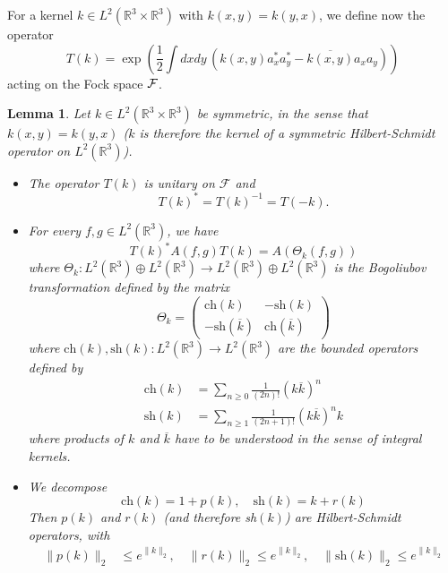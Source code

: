 \documentclass[11pt,a4paper,DIV11]{scrartcl}	%
\newtheorem{lem}[thm]{Lemma}
\newcommand{\bR}{{\mathbb R}}
\newcommand{\cF}{{\cal F}}
\newcommand{\R}{\mathds{R}}
\begin{document}
\medskip

For a kernel $k \in L^2 (\bR^3 \times \bR^3)$ with $k (x,y) = k(y,x)$, we define now the operator 
\begin{equation}\label{eq:Tk-def} T (k) = \exp \left(\frac{1}{2} \int dx dy \, \left(k(x,y) a_x^* a_y^* - \overline{k (x,y)} a_x a_y \right) \right) \end{equation} 
acting on the Fock space $\cF$. 
\begin{lem} \label{l:bt}
Let $k \in L^2(\R^3 \times \R^3)$ be symmetric, in the sense that $k(x,y) = k(y,x)$ ($k$ is therefore the kernel of a symmetric Hilbert-Schmidt operator on $L^2 (\bR^3)$). 
\begin{itemize}
\item[(i)] The operator $T(k)$ is unitary on $\mathcal{F}$ and
  \[
    T(k)^* = T(k)^{-1} = T(-k).
  \]
\item[(ii)] For every $f,g \in L^2 (\bR^3)$, we have 
\begin{equation}\label{eq:TAT} T (k)^* A(f,g) T(k) = A (\Theta_k (f,g)) \end{equation}
where $\Theta_k : L^2 (\bR^3) \oplus L^2 (\bR^3) \to L^2 (\bR^3) \oplus L^2 (\bR^3)$ is the Bogoliubov transformation defined by the matrix 
\[ \Theta_k = \left(\begin{array}{ll} \text{ch} (k)  & - \text{sh} (k)  \\ - \text{sh} (\overline{k}) & \text{ch} (\overline{k}) \end{array} \right) \]
where $\text{ch} (k), \text{sh} (k) : L^2 (\bR^3) \to L^2 (\bR^3)$ are the bounded operators defined by 
\[ \begin{split} 
\text{ch} (k) & = \sum_{n\geq 0} \frac{1}{(2n)!} (k\overline{k})^n \\
\text{sh} (k)  & = \sum_{n \geq 1} \frac{1}{(2n+1)!} (k\overline{k})^n k \end{split} \]
where products of $k$ and $\overline{k}$ have to be understood in the sense of integral kernels. 
\item[(iii)] We decompose 
\begin{equation}\label{eq:pr-def} \text{ch} (k) = 1 + p (k) , \quad \text{sh} (k) = k + r (k) \end{equation}
Then $p (k)$ and $r (k)$ (and therefore sh$(k)$) are Hilbert-Schmidt operators, with 
\begin{equation}
\begin{split}
 \| p (k) \|_{2} & \le e^{\| k \|_{2}}, \quad 
\| r (k) \|_{2} \le e^{\| k \|_{2}},  \quad \| \text{sh} (k) \|_2 \leq  e^{\| k \|_{2}} 

\end{split}
\end{equation}
\end{itemize}
\end{lem}
\end{document}
